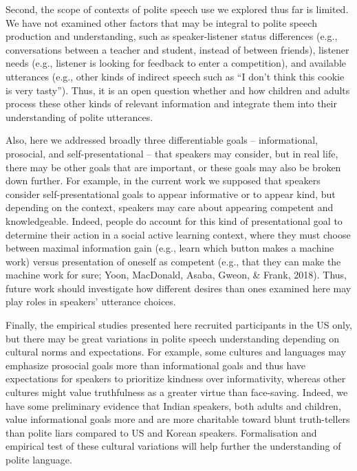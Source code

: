\documentclass[oneside]{report}
\begin{document}
Second, the scope of contexts of polite speech use we explored thus far
is limited. We have not examined other factors that may be integral to
polite speech production and understanding, such as speaker-listener
status differences (e.g., conversations between a teacher and student,
instead of between friends), listener needs (e.g., listener is looking
for feedback to enter a competition), and available utterances (e.g.,
other kinds of indirect speech such as ``I don't think this cookie is
very tasty''). Thus, it is an open question whether and how children and
adults process these other kinds of relevant information and integrate
them into their understanding of polite utterances.

Also, here we addressed broadly three differentiable goals --
informational, prosocial, and self-presentational -- that speakers may
consider, but in real life, there may be other goals that are important,
or these goals may also be broken down further. For example, in the
current work we supposed that speakers consider self-presentational
goals to appear informative or to appear kind, but depending on the
context, speakers may care about appearing competent and knowledgeable.
Indeed, people do account for this kind of presentational goal to
determine their action in a social active learning context, where they
must choose between maximal information gain (e.g., learn which button
makes a machine work) versus presentation of oneself as competent (e.g.,
that they can make the machine work for sure; Yoon, MacDonald, Asaba,
Gweon, \& Frank, 2018). Thus, future work should investigate how
different desires than ones examined here may play roles in speakers'
utterance choices.

Finally, the empirical studies presented here recruited participants in
the US only, but there may be great variations in polite speech
understanding depending on cultural norms and expectations. For example,
some cultures and languages may emphasize prosocial goals more than
informational goals and thus have expectations for speakers to
prioritize kindness over informativity, whereas other cultures might
value truthfulness as a greater virtue than face-saving. Indeed, we have
some preliminary evidence that Indian speakers, both adults and
children, value informational goals more and are more charitable toward
blunt truth-tellers than polite liars compared to US and Korean
speakers. Formalisation and empirical test of these cultural variations
will help further the understanding of polite language.
\end{document}

